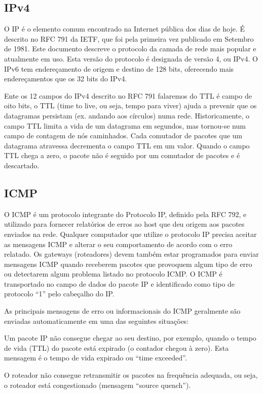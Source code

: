 \documentclass[
	article,			%
	11pt,				%
	oneside,			%
	a4paper,			%
	english,			%
	brazil,				%
	sumario=tradicional
	]{abntex2}
\begin{document}
\subsection{IPv4}
O IP é o elemento comum encontrado na Internet pública dos dias de hoje. É descrito no RFC 791 da IETF, que foi pela primeira vez publicado em Setembro de 1981. Este documento descreve o protocolo da camada de rede mais popular e atualmente em uso. Esta versão do protocolo é designada de versão 4, ou IPv4. O IPv6 tem endereçamento de origem e destino de 128 bits, oferecendo mais endereçamentos que os 32 bits do IPv4.

Ente os 12 campos do IPv4 descrito no RFC 791 falaremos do TTL é campo de oito bits, o TTL (time to live, ou seja, tempo para viver) ajuda a prevenir que os datagramas persistam (ex. andando aos círculos) numa rede. Historicamente, o campo TTL limita a vida de um datagrama em segundos, mas tornou-se num campo de contagem de nós caminhados. Cada comutador de pacotes que um datagrama atravessa decrementa o campo TTL em um valor. Quando o campo TTL chega a zero, o pacote não é seguido por um comutador de pacotes e é descartado.

\subsection{ICMP}

O ICMP é um protocolo integrante do Protocolo IP, definido pela RFC 792, e utilizado para fornecer relatórios de erros ao host que deu origem aos pacotes enviados na rede. Qualquer computador que utilize o protocolo IP precisa aceitar as mensagens ICMP e alterar o seu comportamento de acordo com o erro relatado. Os gateways (roteadores) devem também estar programados para enviar mensagens ICMP quando receberem pacotes que provoquem algum tipo de erro ou detectarem algum problema listado no protocolo ICMP. O ICMP é transportado no campo de dados do pacote IP e identificado como tipo de protocolo “1” pelo cabeçalho do IP.

As principais mensagens de erro ou informacionais do ICMP geralmente são enviadas automaticamente em uma das seguintes situações:

Um pacote IP não consegue chegar ao seu destino, por exemplo, quando o tempo de vida (TTL) do pacote está expirado (o contador chegou à zero). Esta mensagem é o tempo de vida expirado ou “time exceeded”.

O roteador não consegue retransmitir os pacotes na frequência adequada, ou seja, o roteador está congestionado (mensagem “source quench”).
\end{document}
